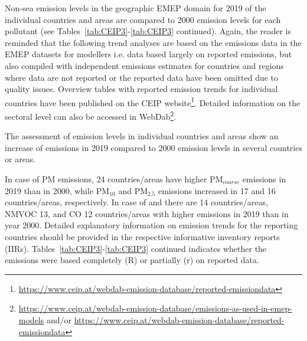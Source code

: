Non-sea emission levels in the geographic EMEP domain for 2019 of the individual countries and areas are compared to 2000 emission levels for each pollutant (see Tables~\ref{tab:CEIP3}-\ref{tab:CEIP3} continued). Again, the reader is reminded that the following trend analyses are based on the emissions data in the EMEP datasets for modellers i.e. data based largely on reported emissions, but also compiled with independent emissions estimates for countries and regions where data are not reported or the reported data have been omitted due to quality issues. Overview tables with reported emission trends for individual countries have been published on the CEIP website\footnote{\url{https://www.ceip.at/webdab-emission-database/reported-emissiondata}}. Detailed information on the sectoral level can also be accessed in WebDab\footnote{\url{https://www.ceip.at/webdab-emission-database/emissions-as-used-in-emep-models} and/or \url{https://www.ceip.at/webdab-emission-database/reported-emissiondata}}.

The assessment of emission levels in individual countries and areas show an increase of emissions in 2019 compared to 2000 emission levels in several countries or areas.


In case of PM emissions, 24 countries/areas have higher PM$_{coarse}$ emissions in 2019 than in 2000, while PM$_{10}$ and PM$_{2.5}$ emissions increased in 17 and 16 countries/areas, respectively. In case of \nox and \sox there are 14  countries/areas, NMVOC 13,  and CO 12
countries/areas with higher emissions in 2019 than in year 2000. Detailed explanatory information on emission trends for the reporting countries should be provided in the respective informative inventory reports (IIRs). Tables~\ref{tab:CEIP3}-\ref{tab:CEIP3} continued indicates whether the emissions were based completely  (R) or partially (r) on reported data. 

